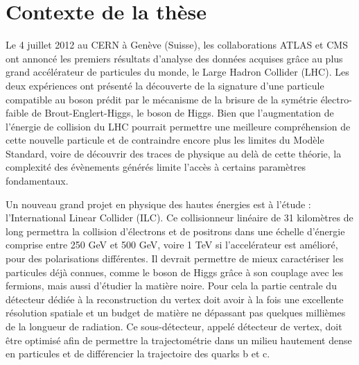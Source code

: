 \documentclass[a4papper, 10pt]{article}
\title{\textbf{Intelligent detection layers for advanced tracking in high-energy physics} \\ \large \vskip 1ex
        Résumé de la thèse de doctorat}
\author{Benjamin Boitrelle \\ 
        Sous la direction de : \\
        Jérôme Baudot : Directeur de thèse à l'Université de Strasbourg \\
        Ingrid Maria Gregor : Encadrante au laboratoire d'accueil au DESY de Hambourg}
\date{}
\begin{document}
    \maketitle


  \section{Contexte de la thèse}

  Le 4 juillet 2012 au CERN à Genève (Suisse), les collaborations ATLAS et CMS ont annoncé les premiers résultats d'analyse des données acquises grâce au plus grand accélérateur de particules du monde, le Large Hadron Collider (LHC). 
  Les deux expériences ont présenté la découverte de la signature d'une particule compatible au boson prédit par le mécanisme de la brisure de la symétrie électro-faible de Brout-Englert-Higgs, le boson de Higgs.
  Bien que l'augmentation de l'énergie de collision du LHC pourrait permettre une meilleure compréhension de cette nouvelle particule et de contraindre encore plus les limites du Modèle Standard, voire de découvrir des traces de physique au delà de cette théorie, la complexité des évènements générés limite l'accès à certains paramètres fondamentaux.

  Un nouveau grand projet en physique des hautes énergies est à l'étude : l'International Linear Collider (ILC). 
  Ce collisionneur linéaire de 31 kilomètres de long permettra la collision d'électrons et de positrons dans une échelle d'énergie comprise entre 250 GeV et 500 GeV, voire 1 TeV si l'accelérateur est amélioré, pour des polarisations différentes.
  Il devrait permettre de mieux caractériser les particules déjà connues, comme le boson de Higgs grâce à son couplage avec les fermions, mais aussi d'étudier la matière noire. 
  Pour cela la partie centrale du détecteur dédiée à la reconstruction du vertex doit avoir à la fois une excellente résolution spatiale et un budget de matière ne dépassant pas quelques millièmes de la longueur de radiation. 
  Ce sous-détecteur, appelé détecteur de vertex, doit être optimisé afin de permettre la trajectométrie dans un milieu hautement dense en particules et de différencier la trajectoire des quarks b et c.
\end{document}
